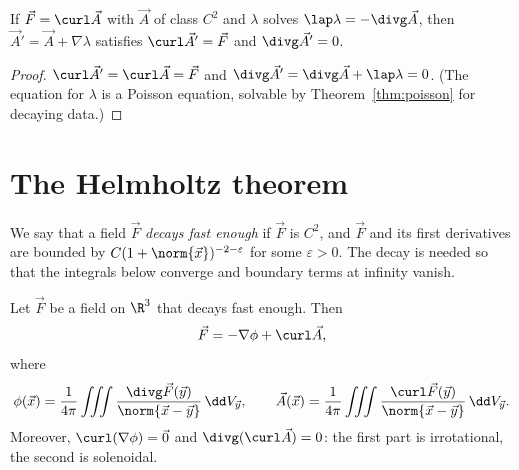 \begin{proposition}\label{prop:coulombgauge}
If $\vec F=\curl\vec A$ with $\vec A$ of class $C^2$ and $\lambda$ solves $\lap\lambda=-\divg\vec A$, then $\vec A'=\vec A+\nabla\lambda$ satisfies $\curl\vec A'=\vec F$ and $\divg\vec A'=0$.
\end{proposition}

\begin{proof}
$\curl\vec A'=\curl\vec A=\vec F$ and $\divg\vec A'=\divg\vec A+\lap\lambda=0$. (The equation for $\lambda$ is a Poisson equation, solvable by Theorem~\ref{thm:poisson} for decaying data.)
\end{proof}

\section{The Helmholtz theorem}

We say that a field $\vec F$ \emph{decays fast enough} if $\vec F$ is $C^2$, and $\vec F$ and its first derivatives are bounded by $C(1+\norm{\vec x})^{-2-\varepsilon}$ for some $\varepsilon>0$. The decay is needed so that the integrals below converge and boundary terms at infinity vanish.

\begin{theorem}\label{thm:helmholtz}
Let $\vec F$ be a field on $\R^3$ that decays fast enough. Then
\[
\vec F=-\nabla\phi+\curl\vec A,
\]
where
\[
\phi(\vec x)=\frac1{4\pi}\iiint\frac{\divg\vec F(\vec y)}{\norm{\vec x-\vec y}}\,\dd V_{\vec y},\qquad\vec A(\vec x)=\frac1{4\pi}\iiint\frac{\curl\vec F(\vec y)}{\norm{\vec x-\vec y}}\,\dd V_{\vec y}.
\]
Moreover, $\curl(\nabla\phi)=\vec0$ and $\divg(\curl\vec A)=0$: the first part is irrotational, the second is solenoidal.
\end{theorem}

